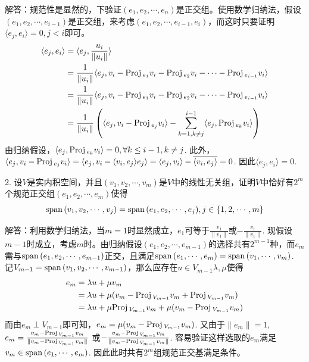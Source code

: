 \documentclass[hyperref,]{ctexart}
\begin{document}
\noindent{}
解答：规范性是显然的，下验证\((e_1,e_2,\cdots,e_n)\)是正交组。使用数学归纳法，假设\((e_1,e_2,\cdots,e_{i-1})\)是正交组，来考虑\((e_1,e_2,\cdots,e_{i-1},e_i)\)，而这时只要证明\(\langle e_j,e_i\rangle =0,j<i\)即可。
\[\begin{aligned}
\langle e_j,e_i\rangle &= \langle e_j, \frac{u_i}{\|u_i\|}\rangle\\
& = \frac{1}{\|u_i\|}\langle e_j,v_i - \mathrm{Proj}\,_{e_1} v_i- \mathrm{Proj}\,_{e_2}v_i-\cdots-\mathrm{Proj}\,_{e_{i-1}}v_i\rangle\\
& = \frac{1}{\|u_i\|}\langle e_j,v_i - \mathrm{Proj}\,_{e_1} v_i- \mathrm{Proj}\,_{e_2}v_i-\cdots-\mathrm{Proj}\,_{e_{i-1}}v_i\rangle\\ 
& = \frac{1}{\|u_i\|}\left(\langle e_j,v_i - \mathrm{Proj}\,_{e_j} v_i\rangle- \sum_{k=1,k\ne j}^{i-1}\langle e_j, \mathrm{Proj}\,_{e_k}v_i\rangle\right)\\ 
\end{aligned}\]
由归纳假设，\(\langle e_j, \mathrm{Proj}\,_{e_k}v_i\rangle=0,\forall k\le i-1,k\ne j\).
此外，\(\langle e_j,v_i - \mathrm{Proj}\,_{e_j} v_i\rangle = \langle e_j,v_i-\langle v_i,e_j\rangle e_j\rangle=\langle e_j,v_i\rangle-\overline{\langle v_i,e_j\rangle}=0\).
因此\(\langle e_j,e_i\rangle =0\).

\bigskip

\noindent{} 2.
设\(V\)是实内积空间，并且\((v_1,v_2,\cdots,v_m)\)是\(V\)中的线性无关组，证明\(V\)中恰好有\(2^m\)个规范正交组\((e_1,e_2,\cdots,e_m)\)使得
\[\mathrm{span}\,(v_1,v_2,\cdots,v_j) = \mathrm{span}\,(e_1,e_2,\cdots,e_j),j\in\{1,2,\cdots,m\}\]

\smallskip

\noindent{}
解答：利用数学归纳法，当\(m=1\)时显然成立，\(e_1\)可等于\(\frac{v_1}{\|v_1\|}\)或\(-\frac{v_1}{\|v_1\|}\).
现假设\(m-1\)时成立，考虑\(m\)时。由归纳假设\((e_1,e_2,\cdots,e_{m-1})\)的选择共有\(2^{m-1}\)种，而\(e_m\)需与\(\mathrm{span}\, (e_1,e_2,\cdots,e_{m-1})\)正交，且满足\(\mathrm{span}\,(e_1,\cdots,e_m) = \mathrm{span}\,(v_1,\cdots,v_m)\).
记\(V_{m-1} = \mathrm{span}\,(v_1,v_2,\cdots,v_{m-1})\)，那么应存在\(u\in V_{m-1}\)\(\lambda,\mu\)使得
\[\begin{aligned}
e_m& = \lambda u+\mu v_m \\
&= \lambda u +\mu (v_m-\mathrm{Proj}\,_{V_{m-1}}v_m+\mathrm{Proj}\,_{V_{m-1}}v_m)\\
& = \lambda u+ \mu \mathrm{Proj}\,_{V_{m-1}}v_m +\mu  (v_m-\mathrm{Proj}\,_{V_{m-1}}v_m)\\
\end{aligned}\]
而由\(e_m\perp V_{m-1}\)即可知，\(e_m = \mu (v_m-\mathrm{Proj}\,_{V_{m-1}}v_m)\).
又由于\(\|e_m\|=1\),
\(e_m = \frac{v_m-\mathrm{Proj}\,_{V_{m-1}}v_m}{\|v_m-\mathrm{Proj}\,_{V_{m-1}}v_m\|}\)
或\(-\frac{v_m-\mathrm{Proj}\,_{V_{m-1}}v_m}{\|v_m-\mathrm{Proj}\,_{V_{m-1}}v_m\|}\).
容易验证这样选取的\(e_m\)满足\(v_m \in \mathrm{span}\,(e_1,\cdots,e_m)\).
因此此时共有\(2^m\)组规范正交基满足条件。
\end{document}
